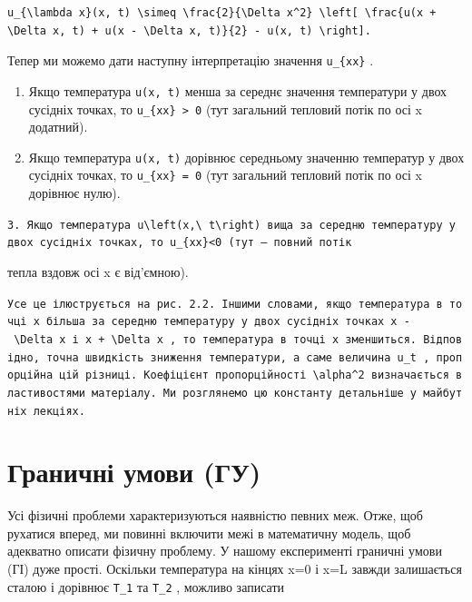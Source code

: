 \documentclass[
  ukrainian,
]{article}
\begin{document}
\begin{verbatim}
u_{\lambda x}(x, t) \simeq \frac{2}{\Delta x^2} \left[ \frac{u(x + \Delta x, t) + u(x - \Delta x, t)}{2} - u(x, t) \right].
\end{verbatim}

Тепер ми можемо дати наступну інтерпретацію значення \texttt{u\_\{xx\}}
.

\begin{enumerate}
\def\labelenumi{\arabic{enumi}.}
\item
  Якщо температура \texttt{u(x,\ t)} менша за середнє значення
  температури у двох сусідніх точках, то
  \texttt{u\_\{xx\}\ \textgreater{}\ 0} (тут загальний тепловий потік по
  осі x додатний).
\item
  Якщо температура \texttt{u(x,\ t)} дорівнює середньому значенню
  температур у двох сусідніх точках, то \texttt{u\_\{xx\}\ =\ 0} (тут
  загальний тепловий потік по осі x дорівнює нулю).
\end{enumerate}

\texttt{3.\ Якщо\ температура\ \textquotesingle{}u\textbackslash{}left(x,\textbackslash{}\ t\textbackslash{}right)\textquotesingle{}\ вища\ за\ середню\ температуру\ у\ двох\ сусідніх\ точках,\ то\ \textquotesingle{}u\_\{xx\}\textless{}0\textquotesingle{}\ (тут\ —\ повний\ потік}

тепла вздовж осі x є від'ємною).

\texttt{Усе\ це\ ілюструється\ на\ рис.\ 2.2.\ Іншими\ словами,\ якщо\ температура\ в\ точці\ x\ більша\ за\ середню\ температуру\ у\ двох\ сусідніх\ точках\ \textquotesingle{}x\ -\ \textbackslash{}Delta\ x\textquotesingle{}\ і\ \textquotesingle{}x\ +\ \textbackslash{}Delta\ x\textquotesingle{}\ ,\ то\ температура\ в\ точці\ x\ зменшиться.\ Відповідно,\ точна\ швидкість\ зниження\ температури,\ а\ саме\ величина\ \textquotesingle{}u\_t\textquotesingle{}\ ,\ пропорційна\ цій\ різниці.\ Коефіцієнт\ пропорційності\ \textquotesingle{}\textbackslash{}alpha\^{}2\textquotesingle{}\ визначається\ властивостями\ матеріалу.\ Ми\ розглянемо\ цю\ константу\ детальніше\ у\ майбутніх\ лекціях.}

\section{Граничні умови
(ГУ)}\label{ux433ux440ux430ux43dux438ux447ux43dux456-ux443ux43cux43eux432ux438-ux433ux443}

Усі фізичні проблеми характеризуються наявністю певних меж. Отже, щоб
рухатися вперед, ми повинні включити межі в математичну модель, щоб
адекватно описати фізичну проблему. У нашому експерименті граничні умови
(ГІ) дуже прості. Оскільки температура на кінцях x=0 і x=L завжди
залишається сталою і дорівнює \texttt{T\_1} та \texttt{T\_2} , можливо
записати
\end{document}
